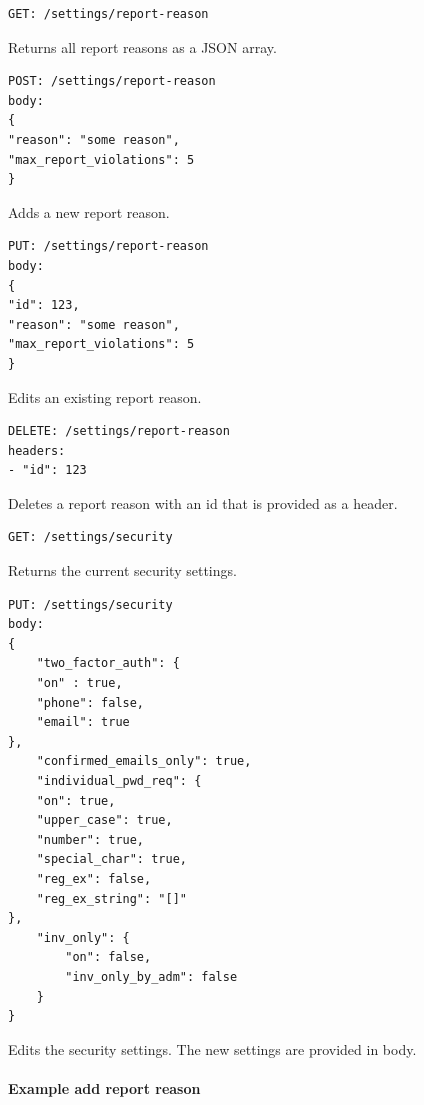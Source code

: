 \begin{lstlisting}[label={lst:lstlisting}]
GET: /settings/report-reason
\end{lstlisting}

Returns all report reasons as a JSON array.

\begin{lstlisting}[label={lst:lstlisting2}]
POST: /settings/report-reason
body:
{
"reason": "some reason",
"max_report_violations": 5
}
\end{lstlisting}

Adds a new report reason.

\begin{lstlisting}[label={lst:lstlisting3}]
PUT: /settings/report-reason
body:
{
"id": 123,
"reason": "some reason",
"max_report_violations": 5
}
\end{lstlisting}

Edits an existing report reason.

\begin{lstlisting}[label={lst:lstlisting4}]
DELETE: /settings/report-reason
headers:
- "id": 123
\end{lstlisting}

Deletes a report reason with an id that is provided as a header.

\begin{lstlisting}[label={lst:lstlisting5}]
GET: /settings/security
\end{lstlisting}

Returns the current security settings.

\begin{lstlisting}[label={lst:lstlisting6}]
PUT: /settings/security
body:
{
    "two_factor_auth": {
    "on" : true,
    "phone": false,
    "email": true
},
    "confirmed_emails_only": true,
    "individual_pwd_req": {
    "on": true,
    "upper_case": true,
    "number": true,
    "special_char": true,
    "reg_ex": false,
    "reg_ex_string": "[]"
},
    "inv_only": {
        "on": false,
        "inv_only_by_adm": false
    }
}
\end{lstlisting}

Edits the security settings.
The new settings are provided in body.

\paragraph{Example add report reason}

